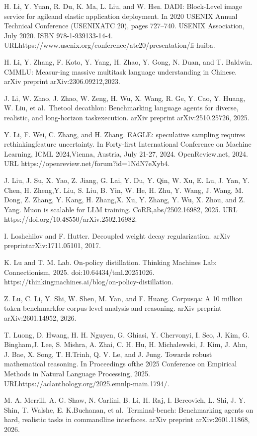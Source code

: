 \documentclass[
  10
]{article}
\begin{document}
H. Li, Y. Yuan, R. Du, K. Ma, L. Liu, and W. Hsu. DADI: Block-Level
image service for agileand elastic application deployment. In 2020
USENIX Annual Technical Conference (USENIXATC 20), pages 727--740.
USENIX Association, July 2020. ISBN 978-1-939133-14-4.
URLhttps://www.usenix.org/conference/atc20/presentation/li-huiba.

H. Li, Y. Zhang, F. Koto, Y. Yang, H. Zhao, Y. Gong, N. Duan, and T.
Baldwin. CMMLU: Measur-ing massive multitask language understanding in
Chinese. arXiv preprint arXiv:2306.09212,2023.

J. Li, W. Zhao, J. Zhao, W. Zeng, H. Wu, X. Wang, R. Ge, Y. Cao, Y.
Huang, W. Liu, et al.~Thetool decathlon: Benchmarking language agents
for diverse, realistic, and long-horizon taskexecution. arXiv preprint
arXiv:2510.25726, 2025.

Y. Li, F. Wei, C. Zhang, and H. Zhang. EAGLE: speculative sampling
requires rethinkingfeature uncertainty. In Forty-first International
Conference on Machine Learning, ICML 2024,Vienna, Austria, July 21-27,
2024. OpenReview.net, 2024. URL
https://openreview.net/forum?id=1NdN7eXyb4.

J. Liu, J. Su, X. Yao, Z. Jiang, G. Lai, Y. Du, Y. Qin, W. Xu, E. Lu, J.
Yan, Y. Chen, H. Zheng,Y. Liu, S. Liu, B. Yin, W. He, H. Zhu, Y. Wang,
J. Wang, M. Dong, Z. Zhang, Y. Kang, H. Zhang,X. Xu, Y. Zhang, Y. Wu, X.
Zhou, and Z. Yang. Muon is scalable for LLM training.
CoRR,abs/2502.16982, 2025. URL
https://doi.org/10.48550/arXiv.2502.16982.

I. Loshchilov and F. Hutter. Decoupled weight decay regularization.
arXiv preprintarXiv:1711.05101, 2017.

K. Lu and T. M. Lab. On-policy distillation. Thinking Machines Lab:
Connectionism, 2025. doi:10.64434/tml.20251026.
https://thinkingmachines.ai/blog/on-policy-distillation.

Z. Lu, C. Li, Y. Shi, W. Shen, M. Yan, and F. Huang. Corpusqa: A 10
million token benchmarkfor corpus-level analysis and reasoning. arXiv
preprint arXiv:2601.14952, 2026.

T. Luong, D. Hwang, H. H. Nguyen, G. Ghiasi, Y. Chervonyi, I. Seo, J.
Kim, G. Bingham,J. Lee, S. Mishra, A. Zhai, C. H. Hu, H. Michalewski, J.
Kim, J. Ahn, J. Bae, X. Song, T. H.Trinh, Q. V. Le, and J. Jung. Towards
robust mathematical reasoning. In Proceedings ofthe 2025 Conference on
Empirical Methods in Natural Language Processing, 2025.
URLhttps://aclanthology.org/2025.emnlp-main.1794/.

M. A. Merrill, A. G. Shaw, N. Carlini, B. Li, H. Raj, I. Bercovich, L.
Shi, J. Y. Shin, T. Walshe, E. K.Buchanan, et al.~Terminal-bench:
Benchmarking agents on hard, realistic tasks in commandline interfaces.
arXiv preprint arXiv:2601.11868, 2026.
\end{document}

